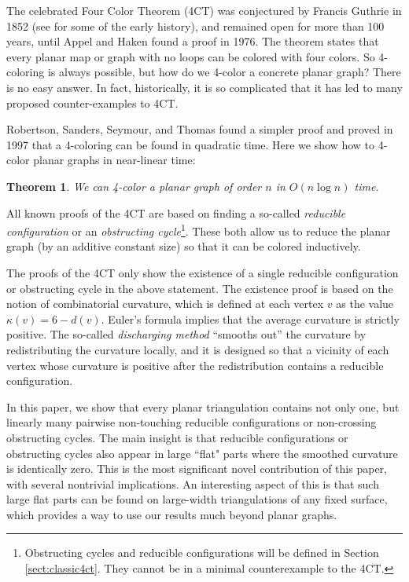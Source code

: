 \documentclass[10pt,a4paper]{article}
\newtheorem{thm}{Theorem}[section]
\begin{document}
The celebrated Four Color Theorem (4CT) 
was conjectured by Francis Guthrie in 1852 (see \cite{madison1897,tait1880dual} for some of the early history), and remained open for more than 100 years, until Appel and Haken found a proof \cite{4ct1, 4ct2} in 1976. The theorem states that every planar map or graph with no loops can be colored with four colors. So 4-coloring is always possible, but how do we 4-color a concrete planar graph? There is no easy answer. In fact, historically, it is so complicated that it has led to many proposed counter-examples to 4CT.

Robertson, Sanders, Seymour, and Thomas \cite{RSST, RSST-STOC} 
found a simpler proof and
proved in 1997 that a 4-coloring can be found in quadratic time. Here we show how to 4-color planar graphs in near-linear time:
\begin{thm}\label{thm:linear-time}
    We can 4-color a planar graph of order $n$ in $O(n\log n)$ time.
\end{thm}

All known proofs of the 4CT are based on finding a so-called \emph{reducible configuration} or an \emph{obstructing cycle}\footnote{Obstructing cycles and reducible configurations will be defined in Section \ref{sect:classic4ct}. They cannot be in a minimal counterexample to the 4CT.}. 
These both allow us to reduce the planar graph (by an additive constant size) so that it can be colored inductively.

The proofs of the 4CT only show the existence of a single reducible configuration or obstructing cycle in the above statement. The existence proof is based on the notion of combinatorial curvature, which is defined at each vertex $v$ as the value $\kappa(v)=6-d(v)$. Euler's formula implies that the average curvature is strictly positive. The so-called \emph{discharging method} ``smooths out'' the curvature by redistributing the curvature locally, and it is designed so that a vicinity of each vertex whose curvature is positive after the redistribution contains a reducible configuration.

In this paper, we show that every planar triangulation contains not only one, but linearly many pairwise non-touching reducible configurations or non-crossing obstructing cycles.
The main insight is that reducible configurations or obstructing cycles also appear in large ``flat" parts where the smoothed curvature is identically zero. This is the most significant novel contribution of this paper, with several nontrivial implications. An interesting aspect of this is that such large flat parts can be found on large-width triangulations of any fixed surface, which provides a way to use our results much beyond planar graphs.
\end{document}

